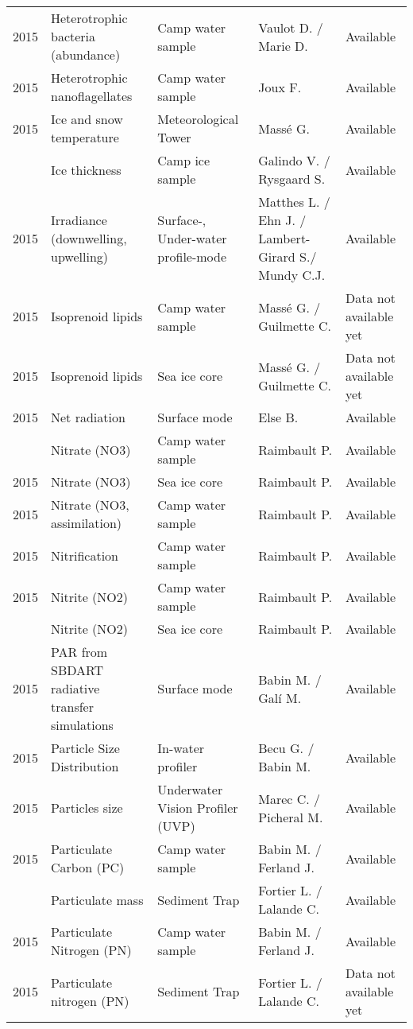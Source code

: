 \documentclass[]{article}
\begin{document}
\begin{landscape}
\begin{longtable}{rllll}
2015 & Heterotrophic bacteria (abundance) & Camp water sample & Vaulot D. / Marie D. & Available\\
2015 & Heterotrophic nanoflagellates & Camp water sample & Joux F. & Available\\
2015 & Ice and snow temperature & Meteorological Tower & Massé G. & Available\\
\addlinespace
2015 & Ice thickness & Camp ice sample & Galindo V. / Rysgaard S. & Available\\
2015 & Irradiance (downwelling, upwelling) & Surface-, Under-water profile-mode & Matthes L. / Ehn J. / Lambert-Girard S./ Mundy C.J. & Available\\
2015 & Isoprenoid lipids & Camp water sample & Massé G. / Guilmette C. & Data not available yet\\
2015 & Isoprenoid lipids & Sea ice core & Massé G. / Guilmette C. & Data not available yet\\
2015 & Net radiation & Surface mode & Else B. & Available\\
\addlinespace
2015 & Nitrate (NO3) & Camp water sample & Raimbault P. & Available\\
2015 & Nitrate (NO3) & Sea ice core & Raimbault P. & Available\\
2015 & Nitrate (NO3, assimilation) & Camp water sample & Raimbault P. & Available\\
2015 & Nitrification & Camp water sample & Raimbault P. & Available\\
2015 & Nitrite (NO2) & Camp water sample & Raimbault P. & Available\\
\addlinespace
2015 & Nitrite (NO2) & Sea ice core & Raimbault P. & Available\\
2015 & PAR from SBDART radiative transfer simulations & Surface mode & Babin M. / Galí M. & Available\\
2015 & Particle Size Distribution & In-water profiler & Becu G. / Babin M. & Available\\
2015 & Particles size & Underwater Vision Profiler (UVP) & Marec C. / Picheral M. & Available\\
2015 & Particulate Carbon (PC) & Camp water sample & Babin M. / Ferland J. & Available\\
\addlinespace
2015 & Particulate mass & Sediment Trap & Fortier L. / Lalande C. & Available\\
2015 & Particulate Nitrogen (PN) & Camp water sample & Babin M. / Ferland J. & Available\\
2015 & Particulate nitrogen (PN) & Sediment Trap & Fortier L. / Lalande C. & Data not available yet\\

\end{longtable}
\end{landscape}
\end{document}

